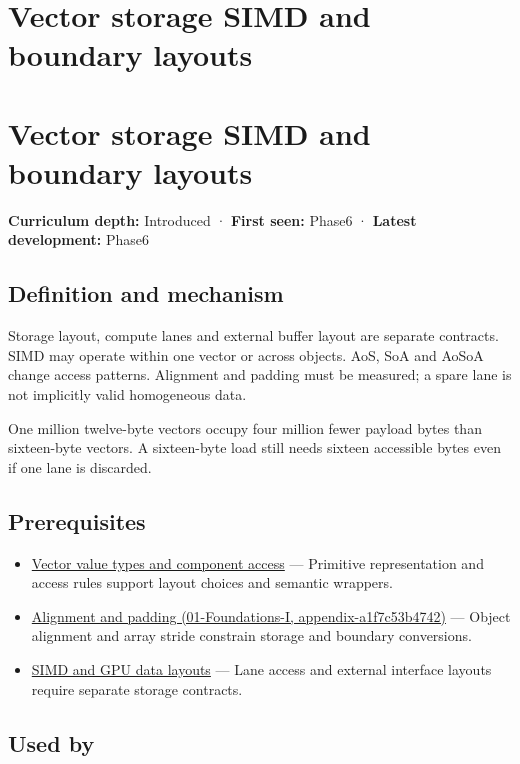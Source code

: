 \hypertarget{appendix-26bf6bf2fb8b}{}
\section*{Vector storage SIMD and boundary layouts}
\section{Vector storage SIMD and boundary layouts}\label{vector-storage-simd-and-boundary-layouts}

\textbf{Curriculum depth:} Introduced · \textbf{First seen:} Phase6 · \textbf{Latest development:} Phase6

\subsection{Definition and mechanism}\label{definition-and-mechanism}

Storage layout, compute lanes and external buffer layout are separate contracts. SIMD may operate within one vector or across objects. AoS, SoA and AoSoA change access patterns. Alignment and padding must be measured; a spare lane is not implicitly valid homogeneous data.

One million twelve-byte vectors occupy four million fewer payload bytes than sixteen-byte vectors. A sixteen-byte load still needs sixteen accessible bytes even if one lane is discarded.

\subsection{Prerequisites}\label{prerequisites}

\begin{itemize}
\tightlist
\item
  \hyperref[appendix-37a39984ba66]{Vector value types and component access} --- Primitive representation and access rules support layout choices and semantic wrappers.
\item
  \href{}{Alignment and padding (01-Foundations-I, appendix-a1f7c53b4742)} --- Object alignment and array stride constrain storage and boundary conversions.
\item
  \hyperref[appendix-3c7b1a56de01]{SIMD and GPU data layouts} --- Lane access and external interface layouts require separate storage contracts.
\end{itemize}

\subsection{Used by}\label{used-by}

